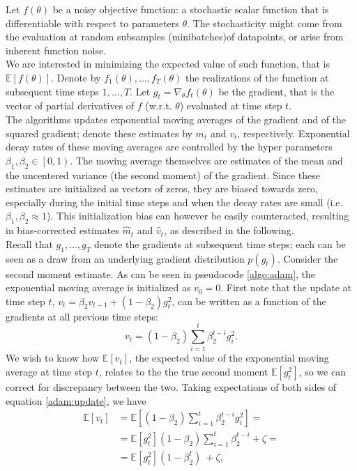 \documentclass[%
    corpo=11pt,
    twoside,
    stile=classica,
    oldstyle,
    autoretitolo,
    tipotesi=magistrale,
    greek,
    evenboxes,
    english
]{toptesi}
\begin{document}
Let $f(\theta)$ be a noisy objective function: a stochastic scalar function that is differentiable with respect to parameters $\theta$. The stochasticity might come from the evaluation at random subsamples (minibatches)of datapoints, or arise from inherent function noise.\\
We are interested in minimizing the expected value of such function, that is $\mathbb{E}\left[f(\theta)\right]$. Denote by $f_1(\theta), \dots,f_T(\theta)$ the realizations of the function at subsequent time steps $1,\dots, T$. Let $g_t = \nabla_{\theta}f_t(\theta)$ be the gradient, that is the vector of partial derivatives of $f$ (w.r.t. $\theta$) evaluated at time step $t$. \\
The algorithms updates exponential moving averages of the gradient and of the squared gradient; denote these estimates by $m_t$ and $v_t$, respectively. Exponential decay rates of these moving averages are controlled by the hyper parameters $\beta_1,\beta_2 \in \left[0,1\right)$. The moving average themselves are estimates of the mean and the uncentered variance (the second moment) of the gradient. Since these estimates are initialized as vectors of zeros, they are biased towards zero, especially during the initial time steps and when the decay rates are small (i.e. $\beta_1,\beta_2 \approx 1$). This initialization bias can however be easily counteracted, resulting in bias-corrected estimates $\hat{m}_t$ and $\hat{v}_t$, as described in the following. \\
Recall that $g_1,\dots,g_T$ denote the gradients at subsequent time steps; each can be seen as a draw from an underlying gradient distribution $p(g_t)$. Consider the second moment estimate. As can be seen in pseudocode \ref{algo:adam}, the exponential moving average is initialized as $v_0 = 0$. First note that the update at time step $t$, $v_t = \beta_2v_{t-1} + (1 -\beta_2)g_t^{2}$, can be written as a function of the gradients at all previous time steps:
\begin{equation}
\label{adam:update}
v_t = (1 - \beta_2)\sum_{i=1}^{t}\beta_2^{t-i}g_i^2.
\end{equation}
We wish to know how $\mathbb{E}\left[v_t\right]$, the expected value of the exponential moving average at time step $t$, relates to the the true second moment $\mathbb{E}\left[g_t^2 \right]$, so we can correct for discrepancy between the two. Taking expectations of both sides of equation \eqref{adam:update}, we have
\begin{align}
\mathbb{E}\left[v_t\right] &= \mathbb{E}\left[ (1 - \beta_2)\sum_{i=1}^{t}\beta_2^{t-i}g_i^2\right] = \\
&= \mathbb{E}\left[g_t^2 \right](1 - \beta_2)\sum_{i=1}^{t}\beta_2^{t-i} + \zeta = \\
&= \mathbb{E}\left[g_t^2 \right](1 - \beta_2^t)\ + \zeta,
\end{align}
\end{document}
